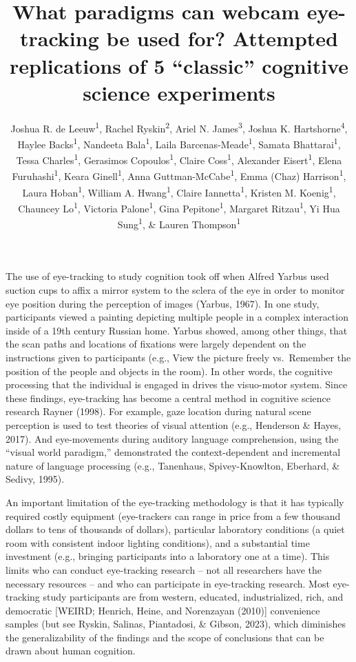 \documentclass[
  man,floatsintext]{apa6}
\title{What paradigms can webcam eye-tracking be used for? Attempted replications of 5 ``classic'' cognitive science experiments}
\author{Joshua R. de Leeuw\textsuperscript{1}, Rachel Ryskin\textsuperscript{2}, Ariel N. James\textsuperscript{3}, Joshua K. Hartshorne\textsuperscript{4}, Haylee Backs\textsuperscript{1}, Nandeeta Bala\textsuperscript{1}, Laila Barcenas-Meade\textsuperscript{1}, Samata Bhattarai\textsuperscript{1}, Tessa Charles\textsuperscript{1}, Gerasimos Copoulos\textsuperscript{1}, Claire Coss\textsuperscript{1}, Alexander Eisert\textsuperscript{1}, Elena Furuhashi\textsuperscript{1}, Keara Ginell\textsuperscript{1}, Anna Guttman-McCabe\textsuperscript{1}, Emma (Chaz) Harrison\textsuperscript{1}, Laura Hoban\textsuperscript{1}, William A. Hwang\textsuperscript{1}, Claire Iannetta\textsuperscript{1}, Kristen M. Koenig\textsuperscript{1}, Chauncey Lo\textsuperscript{1}, Victoria Palone\textsuperscript{1}, Gina Pepitone\textsuperscript{1}, Margaret Ritzau\textsuperscript{1}, Yi Hua Sung\textsuperscript{1}, \& Lauren Thompson\textsuperscript{1}}
\date{}
\affiliation{\vspace{0.5cm}\textsuperscript{1} Cognitive Science Department, Vassar College\\\textsuperscript{2} Department of Cognitive \& Information Science, University of California, Merced\\\textsuperscript{3} Psychology Department, Macalester College\\\textsuperscript{4} Department of Psychology \& Neuroscience, Boston College}
\begin{document}
\maketitle

The use of eye-tracking to study cognition took off when Alfred Yarbus used suction cups to affix a mirror system to the sclera of the eye in order to monitor eye position during the perception of images (Yarbus, 1967). In one study, participants viewed a painting depicting multiple people in a complex interaction inside of a 19th century Russian home. Yarbus showed, among other things, that the scan paths and locations of fixations were largely dependent on the instructions given to participants (e.g., View the picture freely vs.~Remember the position of the people and objects in the room). In other words, the cognitive processing that the individual is engaged in drives the visuo-motor system. Since these findings, eye-tracking has become a central method in cognitive science research Rayner (1998). For example, gaze location during natural scene perception is used to test theories of visual attention (e.g., Henderson \& Hayes, 2017). And eye-movements during auditory language comprehension, using the ``visual world paradigm,'' demonstrated the context-dependent and incremental nature of language processing (e.g., Tanenhaus, Spivey-Knowlton, Eberhard, \& Sedivy, 1995).

An important limitation of the eye-tracking methodology is that it has typically required costly equipment (eye-trackers can range in price from a few thousand dollars to tens of thousands of dollars), particular laboratory conditions (a quiet room with consistent indoor lighting conditions), and a substantial time investment (e.g., bringing participants into a laboratory one at a time). This limits who can conduct eye-tracking research -- not all researchers have the necessary resources -- and who can participate in eye-tracking research. Most eye-tracking study participants are from western, educated, industrialized, rich, and democratic {[}WEIRD; Henrich, Heine, and Norenzayan (2010){]} convenience samples (but see Ryskin, Salinas, Piantadosi, \& Gibson, 2023), which diminishes the generalizability of the findings and the scope of conclusions that can be drawn about human cognition.
\end{document}
